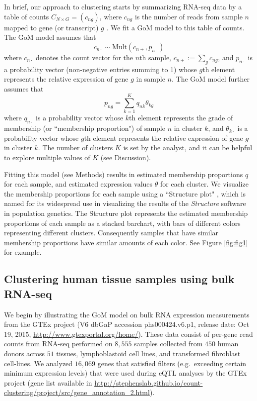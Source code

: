 In brief, our approach to clustering starts by summarizing RNA-seq data by a table of counts $C_{N \times G} = (c_{ng})$, where $c_{ng}$ is the number of reads from sample $n$ mapped to gene (or transcript) $g$ \cite{Oshlack2010}.  We fit a GoM model to this table of counts. The GoM model assumes that 
\begin{equation} \label{eqn:mult}
c_{n\cdot} \sim \text{Mult}(c_{n+}, p_{n\cdot})
\end{equation}
where $c_{n\cdot}$ denotes the count vector for the $n$th sample, $c_{n+} := \sum_g c_{ng}$, and $p_{n\cdot}$ is a probability vector (non-negative entries summing to 1) whose $g$th element represents the relative expression of gene $g$ in sample $n$. 
The GoM model further assumes that 
\begin{equation} \label{eqn:gom}
p_{ng} = \sum_{k=1}^{K} q_{nk}\theta_{kg}    
\end{equation}
where $q_{n\cdot}$ is a probability vector whose $k$th element represents the grade of membership (or ``membership proportion") of
sample $n$ in cluster $k$, and $\theta_{k\cdot}$ is a probability vector whose $g$th element represents
the relative expression of gene $g$ in cluster $k$. The number of clusters $K$ is set by the analyst, and it can be helpful to explore multiple
values of $K$ (see Discussion).

Fitting this model (see Methods) results in estimated membership proportions $q$ for each sample, and estimated expression values $\theta$ for each cluster.
We visualize the membership proportions for each sample using a ``Structure plot" \cite{Rosenberg2002}, 
which is named for its widespread use in visualizing the
results of the {\it Structure} software \cite{Pritchard2000} in population genetics.
The Structure plot represents the estimated membership proportions of each sample 
as a stacked barchart, with bars of different colors representing  different clusters. Consequently samples that have similar membership proportions have
similar amounts of each color. See Figure \ref{fig:fig1} for example.

\subsection{Clustering human tissue samples using bulk RNA-seq}

We begin by illustrating the GoM model on bulk RNA expression measurements from the GTEx project (V6 dbGaP accession phs000424.v6.p1, release date: Oct 19, 2015, \url{http://www.gtexportal.org/home/}).  These data consist of per-gene read counts from RNA-seq performed on $8,555$ samples collected from $450$ human donors across $51$ tissues, lymphoblastoid cell lines, and transformed fibroblast cell-lines. We analyzed $16,069$ genes that satisfied filters (e.g.~exceeding certain minimum expression levels) that were used during eQTL analyses by the GTEx project (gene list available in \url{http://stephenslab.github.io/count-clustering/project/src/gene_annotation_2.html}). 


